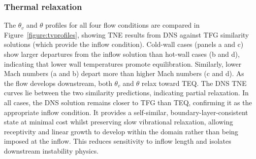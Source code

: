 
\subsubsection{Thermal relaxation}\label{section:disturbance:thermal_relaxation}
The $\theta_v$ and $\theta$ profiles for all four flow conditions are compared in Figure~\ref{figure:tvprofiles}, showing \gls{TNE} results from \gls{DNS} against \gls{TFG} similarity solutions (which provide the inflow condition). Cold-wall cases (panels a and c) show larger departures from the inflow solution than hot-wall cases (b and d), indicating that lower wall temperatures promote equilibration. Similarly, lower Mach numbers (a and b) depart more than higher Mach numbers (c and d). As the flow develops downstream, both $\theta_v$ and $\theta$ relax toward \gls{TEQ}. The \gls{DNS} \gls{TNE} curves lie between the two similarity predictions, indicating partial relaxation. In all cases, the \gls{DNS} solution remains closer to \gls{TFG} than \gls{TEQ}, confirming it as the appropriate inflow condition. It provides a self-similar, boundary-layer-consistent state at minimal cost whilst preserving slow vibrational relaxation, allowing receptivity and linear growth to develop within the domain rather than being imposed at the inflow. This reduces sensitivity to inflow length and isolates downstream instability physics.

